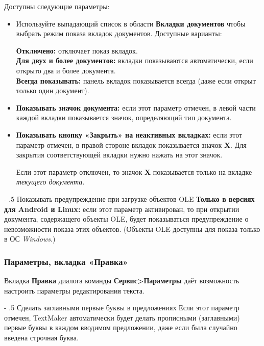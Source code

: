 ﻿\documentclass[a4paper,10pt]{article}
\makeatletter
\renewcommand\paragraph{%
   \@startsection{paragraph}{4}{0mm}%
      {-\baselineskip}%
      {.5\baselineskip}%
      {\normalfont\normalsize\bfseries}}
\makeatother
\begin{document}
 Доступны следующие параметры:
 \begin{itemize}
  \item Используйте выпадающий список в области \textbf{Вкладки документов} чтобы выбрать режим показа вкладок документов. Доступные варианты:
  
  \textbf{Отключено:} отключает показ вкладок.\\
  \textbf{Для двух и более документов:} вкладки показываются автоматически, если открыто два и более документа.\\
  \textbf{Всегда показывать:} панель вкладок показывается всегда (даже если открыт только один документ).
  \item \textbf{Показывать значок документа:} если этот параметр отмечен, в левой части каждой вкладки показывается значок, определяющий тип документа.
  \item \textbf{Показывать кнопку «Закрыть» на неактивных вкладках:} если этот параметр отмечен, в правой стороне вкладок показывается значок \textbf{X}. Для закрытия соответствующей вкладки нужно нажать на этот значок.
  
  Если этот параметр отключен, то значок \textbf{X} показывается только на вкладке \textit{текущего документа}.
 \end{itemize}

 \paragraph{Показывать предупреждение при загрузке объектов OLE}
 \textbf{Только в версиях для Android и Linux:} если этот параметр активирован, то при открытии документа, содержащего объекты OLE, будет показываться предупреждение о невозможности показа этих объектов. (Объекты OLE доступны для показа только в ОС \textit{Windows}.)
 
 \subsubsection{Параметры, вкладка «Правка»}
 Вкладка \textbf{Правка} диалога команды \textbf{Сервис>Параметры} даёт возможность настроить параметры редактирования текста.
 
 \paragraph{Сделать заглавными первые буквы в предложениях}
 Если этот параметр отмечен, TextMaker автоматически будет делать прописными (заглавными) первые буквы в каждом вводимом предложении, даже если была случайно введена строчная буква.
 
\end{document}
